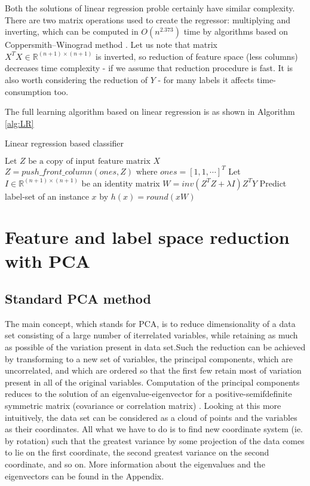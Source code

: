 Both the solutions of linear regression proble certainly have similar complexity. There are two matrix operations used to create the regressor: multiplying and inverting, which can be computed in $O(n^{2.373})$ time by algorithms based on Coppersmith–Winograd method \cite{VVW}. Let us note that matrix $X^TX \in \mathbb{R}^{(n+1) \times (n+1)}$ is inverted, so reduction of feature space (less columns) decreases time complexity - if we assume that reduction procedure is fast. It is also worth considering the reduction of $Y$ - for many labels it affects time-consumption too. 

The full learning algorithm based on linear regression is as shown in Algorithm \ref{alg:LR} 

\begin{algorithm}
    \caption{Linear regression based classifier}\label{alg:LR}
    \begin{algorithmic}[1]
    \State $\text{Let } Z \text{ be a copy of input feature matrix } X$
    \State $Z=push\_front\_column(ones, Z) \text{ where } ones=[1, 1, \cdots]^T$
    \State Let $I \in \mathbb{R}^{(n+1) \times (n+1)}$ be an identity matrix
    \State $W=inv(Z^TZ+\lambda I)Z^TY$
    \State Predict label-set of an instance $x$ by $h(x)=round(xW)$ 
    \end{algorithmic}
\end{algorithm}


\section{Feature and label space reduction with PCA}

\subsection{Standard PCA method}

The main concept, which stands for PCA, is to reduce dimensionality of a data set consisting of a large number of iterrelated variables, while retaining as much as possible of the variation present in data set.Such the reduction can be achieved by transforming to a new set of variables, the principal components, which are uncorrelated, and which are ordered so that the first few retain most of variation present in all of the original variables. Computation of the principal components reduces to the solution of an eigenvalue-eigenvector for a positive-semifdefinite symmetric matrix (covariance or correlation matrix) \cite{Jolliffe}. Looking at this more intuitively, the data set can be considered as a cloud of points and the variables as their coordinates. All what we have to do is to find new coordinate system (ie. by rotation) such that the greatest variance by some projection of the data comes to lie on the first coordinate, the second greatest variance on the second coordinate, and so on. More information about the eigenvalues and the eigenvectors can be found in the Appendix. 

